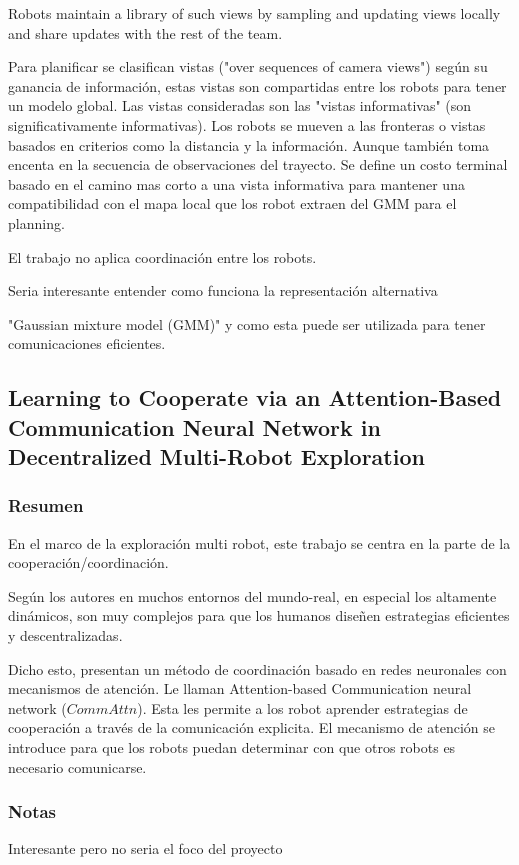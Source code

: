 Robots maintain a library of such views by sampling and updating views locally and share updates with the rest of the team. 

Para planificar se clasifican vistas ("over sequences of camera views") según su ganancia de información, estas vistas son compartidas entre los robots para tener un modelo global. Las vistas consideradas son las "vistas informativas" (son significativamente informativas).
Los robots se mueven a las fronteras o vistas basados en criterios como la distancia y la información. Aunque también toma encenta en la secuencia de observaciones del trayecto.
Se define un costo terminal basado en el camino mas corto a una vista informativa para mantener una compatibilidad con el mapa local que los robot extraen del GMM para el planning.

El trabajo no aplica coordinación entre los robots.

Seria interesante entender como funciona la representación alternativa

"Gaussian mixture model (GMM)" y como esta puede ser utilizada para tener comunicaciones eficientes.

\subsection[Learning to Cooperate via an Attention-Based Communication Neural Network in Decentralized Multi-Robot Exploration]{Learning to Cooperate via an Attention-Based\\ Communication Neural Network in Decentralized Multi-Robot Exploration}

\subsubsection{Resumen}
En el marco de la exploración multi robot, este trabajo se centra en la parte de la cooperación/coordinación. 

Según los autores en muchos entornos del mundo-real, en especial los altamente dinámicos, son muy complejos para que los humanos diseñen estrategias eficientes y descentralizadas.

Dicho esto, presentan un método de coordinación basado en redes neuronales con mecanismos de atención. Le llaman Attention-based Communication neural network ($CommAttn$). Esta les permite a los robot aprender estrategias de cooperación a través de la comunicación explicita. El mecanismo de atención se introduce para que los robots puedan determinar con que otros robots es necesario comunicarse.

\subsubsection{Notas}
Interesante pero no seria el foco del proyecto

